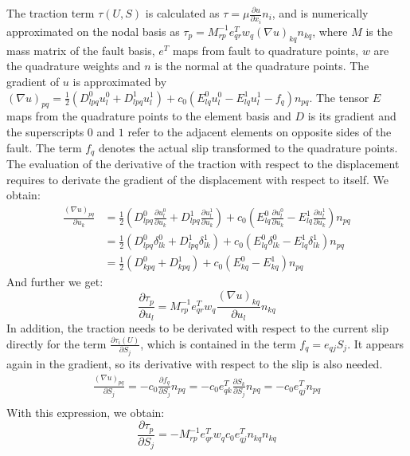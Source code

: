 The traction term $\tau(U,S)$ is calculated as $\tau = \mu \frac{\partial u}{\partial x_i}n_i$, and is numerically approximated on the nodal basis as $\tau_p = M_{rp}^{-1}e_{qr}^Tw_q(\nabla u)_{kq}n_{kq}$, where $M$ is the mass matrix of the fault basis, $e^T$ maps from fault to quadrature points, $w$ are the quadrature weights and $n$ is the normal at the quadrature points. The gradient of $u$ is approximated by $(\nabla u)_{pq} = \frac{1}{2}\left(D_{lpq}^0u_l^0 + D_{lpq}^1u_l^1\right) + c_0\left(E_{lq}^0u_l^0 - E_{lq}^1u_l^1 - f_q\right)n_{pq}$. The tensor $E$ maps from the quadrature points to the element basis and $D$ is its gradient and the superscripts $0$ and $1$ refer to the adjacent elements on opposite sides of the fault. The term $f_q$ denotes the actual slip transformed to the quadrature points. The evaluation of the derivative of the traction with respect to the displacement requires to derivate the gradient of the displacement with respect to itself. We obtain: 
\begin{align}
\frac{(\nabla u)_{pq}}{\partial u_k} &= \frac{1}{2}\left(D_{lpq}^0\frac{\partial u_l^0}{\partial u_k} + D_{lpq}^1\frac{\partial u_l^1}{\partial u_k}\right) + c_0\left(E_{lq}^0\frac{\partial u_l^0}{\partial u_k} - E_{lq}^1\frac{\partial u_l^1}{\partial u_k}\right)n_{pq} \\
&= \frac{1}{2}\left(D_{lpq}^0\delta_{lk}^0 + D_{lpq}^1\delta_{lk}^1\right) + c_0\left(E_{lq}^0\delta_{lk}^0 - E_{lq}^1\delta_{lk}^1\right)n_{pq} \\
&= \frac{1}{2}\left(D_{kpq}^0 + D_{kpq}^1\right) + c_0\left(E_{kq}^0 - E_{kq}^1\right)n_{pq} 
\end{align}
And further we get: 
\begin{equation}
\frac{\partial \tau_p}{\partial u_l} = M_{rp}^{-1}e_{qr}^Tw_q
\frac{(\nabla u)_{kq}}{\partial u_l}n_{kq}
\end{equation}
In addition, the traction needs to be derivated with respect to the current slip directly for the term $\frac{\partial \tau_i(U)}{\partial S_j}$, which is contained in the term $f_q = e_{qj}S_j$. It appears again in the gradient, so its derivative with respect to the slip is also needed. 
\begin{align}
\frac{(\nabla u)_{pq}}{\partial S_j} = -c_0 \frac{\partial f_q}{\partial S_j}n_{pq} 
= -c_0 e^T_{qk}\frac{\partial S_k}{\partial S_j}n_{pq} 
= -c_0 e^T_{qj}n_{pq} \\	
\end{align}
With this expression, we obtain: 
\begin{equation}
\frac{\partial \tau_p}{\partial S_j} = -M_{rp}^{-1}e_{qr}^Tw_qc_0e^T_{qj}n_{kq}n_{kq}
\end{equation}
